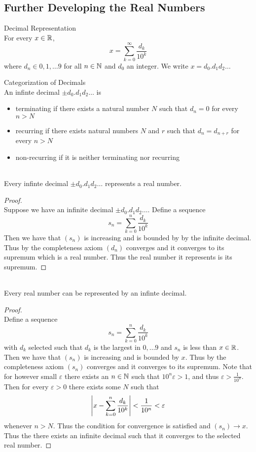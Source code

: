 \documentclass[a4paper]{article}
\begin{document}
\subsection{Further Developing the Real Numbers}
\begin{defn}{Decimal Representation}{}\\ For every $x\in\mathbb{R}$, $$x=\sum_{k=0}^{\infty}\frac{d_k}{10^k}$$ where $d_n\in{0,1,\dots9}$ for all $n\in\mathbb{N}$ and $d_0$ an integer. We write $x=d_0.d_1d_2\dots$
\end{defn}

\begin{defn}{Categorization of Decimals}{}\\ An infinte decimal $\pm d_0.d_1d_2\dots$ is
\begin{itemize}
\item terminating if there exists a natural number $N$ such that $d_n=0$ for every $n>N$
\item recurring if there exists natural numbers $N$ and $r$ such that $d_n=d_{n+r}$ for every $n>N$
\item non-recurring if it is neither terminating nor recurring
\end{itemize}
\end{defn}

\begin{thm}{}{}\\ Every infinte decimal $\pm d_0.d_1d_2\dots$ represents a real number. 
\begin{proof}\\ Suppose we have an infinite decimal $\pm d_0.d_1d_2\dots$. Define a sequence $$s_n=\sum_{k=0}^{n}\frac{d_k}{10^k}$$ Then we have that $(s_n)$ is increasing and is bounded by by the infinite decimal. Thus by the completeness axiom $(d_n)$ converges and it converges to its supremum which is a real number. Thus the real number it represents is its supremum. 
\end{proof}
\end{thm}

\begin{thm}{}{}\\ Every real number can be represented by an infinte decimal. 
\begin{proof}\\ Define a sequence $$s_n=\sum_{k=0}^{n}\frac{d_k}{10^k}$$ with $d_k$ selected such that $d_k$ is the largest in ${0,\dots 9}$ and $s_n$ is less than $x\in\mathbb{R}$. Then we have that $(s_n)$ is increasing and is bounded by $x$. Thus by the completeness axiom $(s_n)$ converges and it converges to its supremum. Note that for however small $\varepsilon$ there exists an $n\in\mathbb{N}$ such that $10^n\varepsilon>1$, and thus $\varepsilon>\frac{1}{10^n}$. Then for every $\varepsilon>0$ there exists some $N$ such that $$\abs{x-\sum_{k=0}^{n}\frac{d_k}{10^k}}<\frac{1}{10^n}<\varepsilon$$ whenever $n>N$. Thus the condition for convergence is satisfied and $(s_n)\to x$. Thus the there exists an infinite decimal such that it converges to the selected real number. 
\end{proof}
\end{thm}
\end{document}
